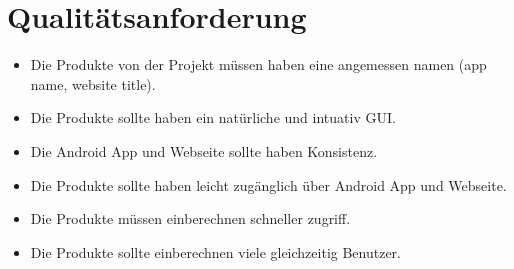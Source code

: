 \section*{Qualit{\"a}tsanforderung}
\begin{itemize}
\item
Die Produkte von der Projekt müssen haben eine angemessen namen (app name, website title).
\item
Die Produkte sollte haben ein natürliche und intuativ GUI.
\item
Die Android App und Webseite sollte haben Konsistenz.
\item
Die Produkte sollte haben leicht zugänglich über Android App und Webseite.
\item
Die Produkte müssen einberechnen schneller zugriff.
\item
Die Produkte sollte einberechnen viele gleichzeitig Benutzer.
\end{itemize}
